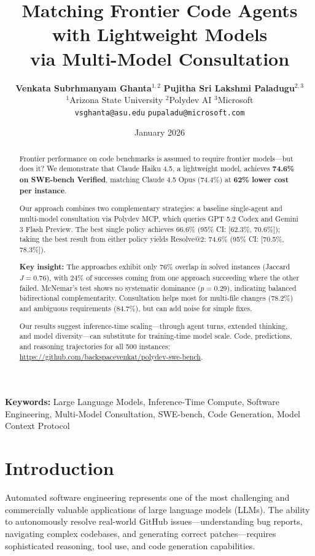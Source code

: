 \documentclass[11pt,a4paper]{article}
\title{\textbf{Matching Frontier Code Agents with Lightweight Models} \\
\Large via Multi-Model Consultation}
\author{
    \textbf{Venkata Subrhmanyam Ghanta}$^{1,2}$ \quad
    \textbf{Pujitha Sri Lakshmi Paladugu}$^{2,3}$ \\[0.5em]
    $^1$Arizona State University \quad $^2$Polydev AI \quad $^3$Microsoft \\[0.3em]
    \texttt{vsghanta@asu.edu} \quad \texttt{pupaladu@microsoft.com}
}
\date{January 2026}
\begin{document}
\maketitle

\begin{abstract}
Frontier performance on code benchmarks is assumed to require frontier models---but does it? We demonstrate that Claude Haiku 4.5, a lightweight model, achieves \textbf{74.6\% on SWE-bench Verified}, matching Claude 4.5 Opus (74.4\%) at \textbf{62\% lower cost per instance}.

Our approach combines two complementary strategies: a baseline single-agent and multi-model consultation via Polydev MCP, which queries GPT 5.2 Codex and Gemini 3 Flash Preview. The best single policy achieves 66.6\% (95\% CI: [62.3\%, 70.6\%]); taking the best result from either policy yields Resolve@2: 74.6\% (95\% CI: [70.5\%, 78.3\%]).

\textbf{Key insight:} The approaches exhibit only 76\% overlap in solved instances (Jaccard $J = 0.76$), with 24\% of successes coming from one approach succeeding where the other failed. McNemar's test shows no systematic dominance ($p = 0.29$), indicating balanced bidirectional complementarity. Consultation helps most for multi-file changes (78.2\%) and ambiguous requirements (84.7\%), but can add noise for simple fixes.

Our results suggest inference-time scaling---through agent turns, extended thinking, and model diversity---can substitute for training-time model scale. Code, predictions, and reasoning trajectories for all 500 instances: \url{https://github.com/backspacevenkat/polydev-swe-bench}.
\end{abstract}

\textbf{Keywords:} Large Language Models, Inference-Time Compute, Software Engineering, Multi-Model Consultation, SWE-bench, Code Generation, Model Context Protocol

\section{Introduction}

Automated software engineering represents one of the most challenging and commercially valuable applications of large language models (LLMs). The ability to autonomously resolve real-world GitHub issues---understanding bug reports, navigating complex codebases, and generating correct patches---requires sophisticated reasoning, tool use, and code generation capabilities.
\end{document}
